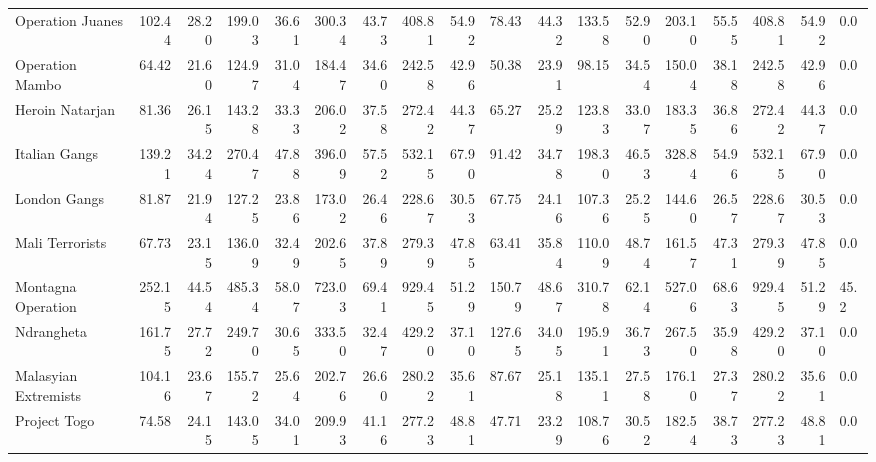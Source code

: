 \begin{tabular}{lrrrrrrrrrrrrrrrrl}
Operation Juanes     &            102.44 &  28.20 &  199.03 &  36.61 &  300.34 &  43.73 &  408.81 &  54.92 &            78.43 &   44.32 &  133.58 &   52.90 &  203.10 &   55.55 &  408.81 &  54.92 &        0.0 \\
Operation Mambo      &             64.42 &  21.60 &  124.97 &  31.04 &  184.47 &  34.60 &  242.58 &  42.96 &            50.38 &   23.91 &   98.15 &   34.54 &  150.04 &   38.18 &  242.58 &  42.96 &        0.0 \\
Heroin Natarjan      &             81.36 &  26.15 &  143.28 &  33.33 &  206.02 &  37.58 &  272.42 &  44.37 &            65.27 &   25.29 &  123.83 &   33.07 &  183.35 &   36.86 &  272.42 &  44.37 &        0.0 \\
Italian Gangs        &            139.21 &  34.24 &  270.47 &  47.88 &  396.09 &  57.52 &  532.15 &  67.90 &            91.42 &   34.78 &  198.30 &   46.53 &  328.84 &   54.96 &  532.15 &  67.90 &        0.0 \\
London Gangs         &             81.87 &  21.94 &  127.25 &  23.86 &  173.02 &  26.46 &  228.67 &  30.53 &            67.75 &   24.16 &  107.36 &   25.25 &  144.60 &   26.57 &  228.67 &  30.53 &        0.0 \\
Mali Terrorists      &             67.73 &  23.15 &  136.09 &  32.49 &  202.65 &  37.89 &  279.39 &  47.85 &            63.41 &   35.84 &  110.09 &   48.74 &  161.57 &   47.31 &  279.39 &  47.85 &        0.0 \\
Montagna Operation   &            252.15 &  44.54 &  485.34 &  58.07 &  723.03 &  69.41 &  929.45 &  51.29 &           150.79 &   48.67 &  310.78 &   62.14 &  527.06 &   68.63 &  929.45 &  51.29 &       45.2 \\
Ndrangheta           &            161.75 &  27.72 &  249.70 &  30.65 &  333.50 &  32.47 &  429.20 &  37.10 &           127.65 &   34.05 &  195.91 &   36.73 &  267.50 &   35.98 &  429.20 &  37.10 &        0.0 \\
Malasyian Extremists &            104.16 &  23.67 &  155.72 &  25.64 &  202.76 &  26.60 &  280.22 &  35.61 &            87.67 &   25.18 &  135.11 &   27.58 &  176.10 &   27.37 &  280.22 &  35.61 &        0.0 \\
Project Togo         &             74.58 &  24.15 &  143.05 &  34.01 &  209.93 &  41.16 &  277.23 &  48.81 &            47.71 &   23.29 &  108.76 &   30.52 &  182.54 &   38.73 &  277.23 &  48.81 &        0.0 \\
\bottomrule
\end{tabular}
